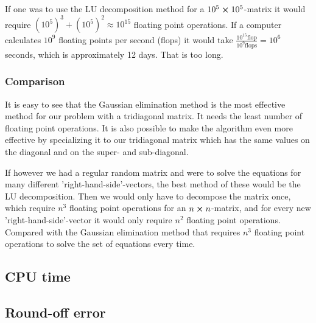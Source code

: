 If one was to use the LU decomposition method for a $10^5 \cross 10^5$-matrix it would require $\left(10^5\right)^3 + \left(10^5\right)^2 \approx 10^{15} $ floating point operations. If a computer calculates $10^9$ floating points per second (flops) it would take $\frac{10^{15}\text{flop}}{10^{9}\text{flops}} = 10^6$ seconds, which is approximately 12 days. That is too long.

\subsubsection{Comparison}

It is easy to see that the Gaussian elimination method is the most effective method for our problem with a tridiagonal matrix. It needs the least number of floating point operations. It is also possible to make the algorithm even more effective by specializing it to our tridiagonal matrix which has the same values on the diagonal and on the super- and sub-diagonal. 

If however we had a regular random matrix and were to solve the equations for many different 'right-hand-side'-vectors, the best method of these would be the LU decomposition. Then we would only have to decompose the matrix once, which require $n^3$ floating point operations for an $n \cross n$-matrix, and for every new 'right-hand-side'-vector it would only require $n^2$ floating point operations. Compared with the Gaussian elimination method that requires $n^3$ floating point operations to solve the set of equations every time.

\subsection{CPU time}


\subsection{Round-off error}